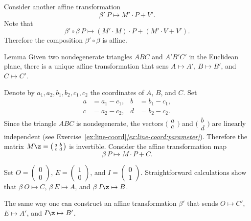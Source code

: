 Consider another affine transformation
\[\beta'\:P  \mapsto M' \cdot P + V'.\]
Note that 
\[\beta'\circ \beta\:P
\mapsto
(M'\cdot M)
\cdot
P
+
(M'\cdot V+V').\]
Therefore the composition $\beta'\circ \beta$ is affine.
\qeds

\begin{thm}{Lemma}\label{lem:matrix-vector}
Given two nondegenerate triangles $ABC$ and $A'B'C'$ in the Euclidean plane, there is a unique affine transformation that sens 
$A\mapsto A'$, $B\mapsto B'$, and $C\mapsto C'$.
\end{thm}


Denote by $a_1,a_2,b_1,b_2,c_1,c_2$ the coordinates of $A$, $B$, and $C$.
Set 
\begin{align*}
a&=a_1-c_1,
&
b&=b_1-c_1,
\\
c&=a_2-c_2,
&
d&=b_2-c_2.
\end{align*}
Since the triangle $ABC$ is nondegenerate, the vectors $\bigl(\begin{smallmatrix}
a\\ c
\end{smallmatrix} \bigr)$ and $\bigl(\begin{smallmatrix}
b\\ d
\end{smallmatrix} \bigr)$ are linearly independent (see Exercise~\ref{ex:line-coord}\textit{\ref{ex:line-coord:parameter}}).
Therefore the matrix $M\z=\bigl(\begin{smallmatrix}
a&b\\ c&d
\end{smallmatrix} \bigr)$ is invertible.
Consider the affine transformation map 
\[\beta\:P\mapsto M \cdot P + C.\]

Set $O=(\begin{smallmatrix}0\\0
\end{smallmatrix})$, $E=(\begin{smallmatrix}1\\0
\end{smallmatrix})$, and $I=(\begin{smallmatrix}0\\1
\end{smallmatrix})$.
Straightforward calculations show that $\beta\:O\mapsto C$, $\beta\:E\mapsto A$, and $\beta\:I\z\mapsto B$.

The same way one can construct an affine transformation $\beta'$ that sends $O\mapsto C'$, $E\mapsto A'$, and $I\z\mapsto B'$.

